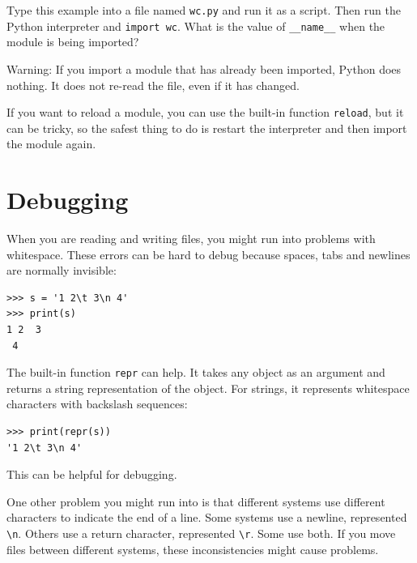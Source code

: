 \documentclass[10pt]{book}
\begin{document}
\begin{ex}
Type this example into a file named {\tt wc.py} and run
it as a script.  Then run the Python interpreter and
{\tt import wc}.  What is the value of \verb"__name__"
when the module is being imported?

Warning: If you import a module that has already been imported,
Python does nothing.  It does not re-read the file, even if it has
changed.


If you want to reload a module, you can use the built-in function 
{\tt reload}, but it can be tricky, so the safest thing to do is
restart the interpreter and then import the module again.
\end{ex}



\section{Debugging}


When you are reading and writing files, you might run into problems
with whitespace.  These errors can be hard to debug because spaces,
tabs and newlines are normally invisible:

\beforeverb
\begin{verbatim}
>>> s = '1 2\t 3\n 4'
>>> print(s)
1 2	 3
 4
\end{verbatim}
\afterverb


The built-in function {\tt repr} can help.  It takes any object as an
argument and returns a string representation of the object.  For
strings, it represents whitespace
characters with backslash sequences:

\beforeverb
\begin{verbatim}
>>> print(repr(s))
'1 2\t 3\n 4'
\end{verbatim}
\afterverb

This can be helpful for debugging.

One other problem you might run into is that different systems
use different characters to indicate the end of a line.  Some
systems use a newline, represented \verb"\n".  Others use
a return character, represented \verb"\r".  Some use both.
If you move files between different systems, these inconsistencies
might cause problems.
\end{document}
